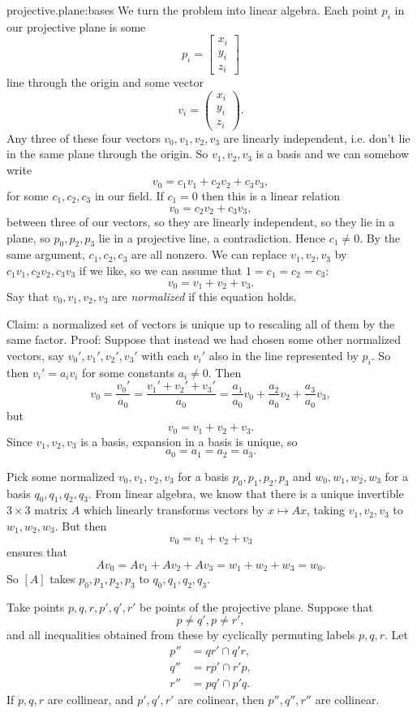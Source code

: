 \begin{answer}{projective.plane:bases}
We turn the problem into linear algebra.
Each point \(p_i\) in our projective plane is some
\[
p_i=
\begin{bmatrix}
x_i\\
y_i\\
z_i
\end{bmatrix}
\]
line through the origin and some vector
\[
v_i=
\begin{pmatrix}
x_i\\
y_i\\
z_i
\end{pmatrix}.
\]
Any three of these four vectors \(v_0,v_1,v_2,v_3\) are linearly independent, i.e. don't lie in the same plane through the origin.
So \(v_1,v_2,v_3\) is a basis and we can somehow write
\[
v_0=c_1v_1+c_2v_2+c_3v_3,
\] 
for some \(c_1,c_2,c_3\) in our field.
If \(c_1=0\) then this is a linear relation
\[
v_0=c_2v_2+c_3v_3,
\]
between three of our vectors, so they are linearly independent, so they lie in a plane, so \(p_0,p_2,p_3\) lie in a projective line, a contradiction.
Hence \(c_1\ne 0\).
By the same argument, \(c_1,c_2,c_3\) are all nonzero.
We can replace \(v_1,v_2,v_3\) by \(c_1v_1,c_2v_2,c_3v_3\) if we like, so we can assume that \(1=c_1=c_2=c_3\):
\[
v_0=v_1+v_2+v_3.
\]
Say that \(v_0,v_1,v_2,v_3\) are \emph{normalized} if this equation holds.

Claim: a normalized set of vectors is unique up to rescaling all of them by the same factor.
Proof: Suppose that instead we had chosen some other normalized vectors, say \(v_0',v_1',v_2',v_3'\) with  each \(v_i'\) also in the line represented by \(p_i\).
So then \(v_i'=a_i v_i\) for some constants \(a_i\ne 0\).
Then 
\[
v_0=\frac{v_0'}{a_0}=\frac{v_1'+v_2'+v_3'}{a_0}=\frac{a_1}{a_0}v_0+\frac{a_2}{a_0}v_2+\frac{a_3}{a_0}v_3,
\]
but 
\[
v_0=v_1+v_2+v_3.
\]
Since \(v_1,v_2,v_3\) is a basis, expansion in a basis is unique, so
\[
a_0=a_1=a_2=a_3.
\]

Pick some normalized \(v_0,v_1,v_2,v_3\) for a basis \(p_0,p_1,p_2,p_3\) and \(w_0,w_1,w_2,w_3\) for a basis \(q_0,q_1,q_2,q_3\).
From linear algebra, we know that there is a unique invertible \(3\times 3\) matrix \(A\) which linearly transforms vectors by \(x\mapsto Ax\), taking \(v_1,v_2,v_3\) to \(w_1,w_2,w_3\).
But then
\[
v_0=v_1+v_2+v_3
\]
ensures that
\[
Av_0=Av_1+Av_2+Av_3=w_1+w_2+w_3=w_0.
\]
So \([A]\) takes \(p_0,p_1,p_2,p_3\) to \(q_0,q_1,q_2,q_3\).
\end{answer}
\begin{theorem}[Pappus]\label{theorem:Pappus}
Take points \(p,q,r,p',q',r'\) be points of the projective plane.
Suppose that 
\[
p\ne q', p\ne r', 
\]
and all inequalities obtained from these by cyclically permuting labels \(p,q,r\).
Let
\begin{align*}
p''&=qr'\cap q'r, \\
q''&=rp'\cap r'p, \\
r''&=pq'\cap p'q.
\end{align*} 
If \(p,q,r\) are collinear, and \(p',q',r'\) are colinear, then \(p'',q'',r''\) are collinear.
\end{theorem}
